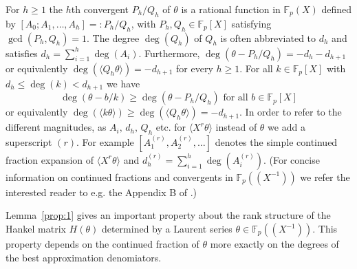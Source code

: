 \documentclass{article}
\newcommand{\FF}{\mathbb{F}}
\renewcommand{\(}{\left (}
\renewcommand{\)}{\right )}
\theoremstyle{definition}
\numberwithin{equation}{section}
\begin{document}
For $h\geq 1$ the $h$th convergent $P_h/Q_h$ of $\theta$ is a rational function in $\FF_p(X)$ defined by $[A_0;A_1,\ldots,A_h]=:P_h/Q_h$, with $P_h,Q_h\in\FF_p[X]$ satisfying $\gcd(P_h,Q_h)=1$. The degree $\deg(Q_h)$ of $Q_h$ is often abbreviated to $d_h$ and satisfies $d_h=\sum_{i=1}^h\deg(A_i)$. Furthermore, $\deg(\theta-P_h/Q_h)=-d_h-d_{h+1}$ or equivalently $\deg(\langle Q_h \theta\rangle)=-d_{h+1}$ for every $h\geq 1$. For all $k\in\FF_p[X]$ with $d_h\leq \deg(k)<d_{h+1}$ we have $$\deg(\theta-b/k)\geq \deg(\theta-P_h/Q_h) \mbox{ for all $b\in\FF_p[X]$}$$ or equivalently $\deg(\langle k\theta\rangle)\geq \deg(\langle Q_h\theta\rangle)=-d_{h+1}$. In order to refer to the different magnitudes, as $A_i,\,d_h,\,Q_h$ etc. for $\langle X^r \theta\rangle$ instead of $\theta$ we add a superscript $(r)$. For example $[A^{(r)}_1,A^{(r)}_2,\ldots]$ denotes the simple continued fraction expansion of $\langle X^r \theta\rangle$ and $d^{(r)}_h=\sum_{i=1}^h\deg(A^{(r)}_i)$. (For concise information on continued fractions and convergents in $\FF_p((X^{-1}))$ we refer the interested reader to e.g. the Appendix B of \cite{niesiam}.)

Lemma~\ref{prop:1} gives an important property about the rank structure of the Hankel matrix $H(\theta)$ determined by a Laurent series $\theta\in\FF_p((X^{-1}))$. This property depends on the continued fraction of $\theta$ more exactly on the degrees of the best approximation denomiators. %
\end{document}
